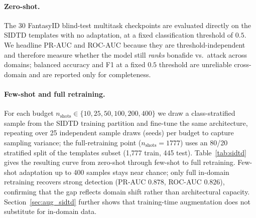 \documentclass[11pt]{article}
\begin{document}
\paragraph{Zero-shot.} The 30 FantasyID blind-test multitask checkpoints are
evaluated directly on the SIDTD templates with no adaptation, at a fixed
classification threshold of $0.5$. We headline PR-AUC and ROC-AUC because they
are threshold-independent and therefore measure whether the model still
\emph{ranks} bonafide vs.\ attack across domains; balanced accuracy and F1 at a
fixed $0.5$ threshold are unreliable cross-domain and are reported only for
completeness.

\paragraph{Few-shot and full retraining.} For each budget
$n_{\text{shots}}\in\{10,25,50,100,200,400\}$ we draw a class-stratified sample
from the SIDTD training partition and fine-tune the same architecture, repeating
over 25 independent sample draws (seeds) per budget to capture sampling variance;
the full-retraining point ($n_{\text{shots}}=1777$) uses an 80/20 stratified
split of the templates subset (1{,}777 train, 445 test). Table~\ref{tab:sidtd}
gives the resulting curve from zero-shot through few-shot to full retraining.
Few-shot adaptation up to 400 samples stays near chance; only full in-domain
retraining recovers strong detection (PR-AUC $0.878$, ROC-AUC $0.826$),
confirming that the gap reflects domain shift rather than architectural capacity.
Section~\ref{sec:aug_sidtd} further shows that training-time augmentation does not
substitute for in-domain data.
\end{document}
